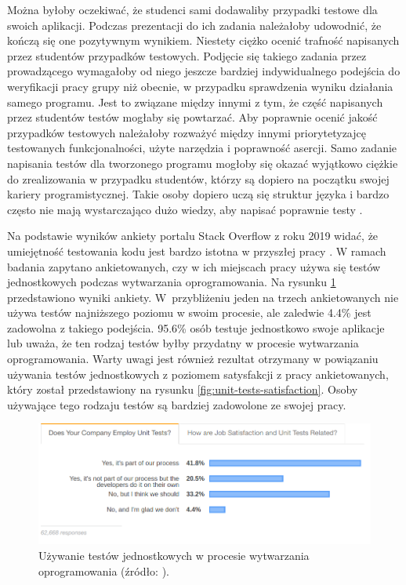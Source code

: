 Można byłoby oczekiwać, że studenci sami dodawaliby przypadki testowe dla swoich aplikacji. 
Podczas prezentacji do ich zadania należałoby udowodnić, że kończą się one pozytywnym wynikiem.
Niestety ciężko ocenić trafność napisanych przez studentów przypadków testowych.
Podjęcie się takiego zadania przez prowadzącego wymagałoby od niego jeszcze bardziej indywidualnego podejścia do weryfikacji pracy grupy niż obecnie, w przypadku sprawdzenia wyniku działania samego programu.
Jest to związane między innymi z tym, że część napisanych przez studentów testów mogłaby się powtarzać.
Aby poprawnie ocenić jakość przypadków testowych należałoby rozważyć  między innymi priorytetyzajcę testowanych funkcjonalności, użyte narzędzia i poprawność asercji.
Samo zadanie napisania testów dla tworzonego programu mogłoby się okazać wyjątkowo ciężkie do zrealizowania w przypadku studentów, którzy są dopiero na początku swojej kariery programistycznej.
Takie osoby dopiero uczą się struktur języka i bardzo często nie mają wystarczająco dużo wiedzy, aby napisać poprawnie testy \cite{tests-and-begginers}.

Na podstawie wyników ankiety portalu Stack Overflow z roku 2019 widać, że umiejętność testowania kodu jest bardzo istotna w przyszłej pracy \cite{stack-overflow-survey}.
W ramach badania zapytano ankietowanych, czy w ich miejscach pracy używa się testów jednostkowych podczas wytwarzania oprogramowania.
Na rysunku \ref{fig:unit-tests-use} przedstawiono wyniki ankiety.
W~przybliżeniu jeden na trzech ankietowanych nie używa testów najniższego poziomu w swoim procesie, ale zaledwie 4.4\% jest zadowolna z takiego podejścia.
95.6\% osób testuje jednostkowo swoje aplikacje lub uważa, że ten rodzaj testów byłby przydatny w procesie wytwarzania oprogramowania. 
Warty uwagi jest również rezultat otrzymany w powiązaniu używania testów jednostkowych z poziomem satysfakcji z pracy ankietowanych, który został przedstawiony na rysunku \ref{fig:unit-tests-satisfaction}.
Osoby używające tego rodzaju testów są bardziej zadowolone ze swojej pracy.

\begin{figure}[h]
    \centering
    \includegraphics[width = 13cm]{chapter01/unit-tests-use.png}
    \caption{Używanie testów jednostkowych w procesie wytwarzania oprogramowania (źródło: \cite{stack-overflow-survey}).}
    \label{fig:unit-tests-use}
\end{figure}

